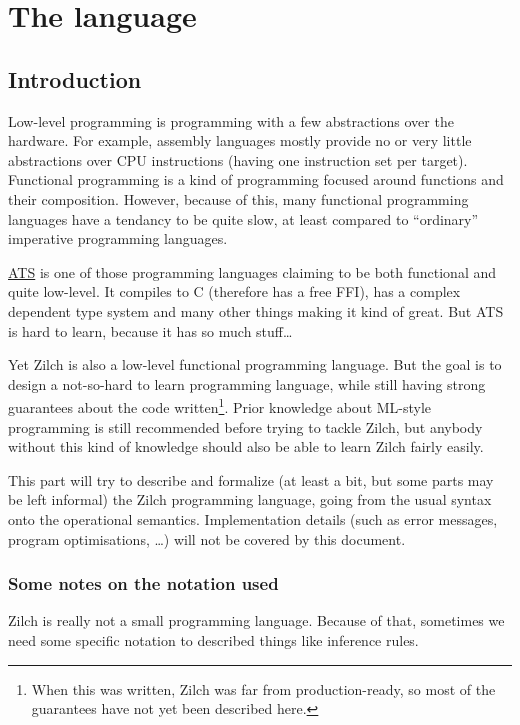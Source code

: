 \part{The language}\label{part:zilch}

\chapter{Introduction}\label{chap:zilch-introduction}

Low-level programming is programming with a few abstractions over the hardware.
For example, assembly languages mostly provide no or very little abstractions over CPU instructions (having one instruction set per target).
Functional programming is a kind of programming focused around functions and their composition.
However, because of this, many functional programming languages have a tendancy to be quite slow, at least compared to ``ordinary'' imperative programming languages.

\href{http://www.ats-lang.org/}{ATS} is one of those programming languages claiming to be both functional and quite low-level.
It compiles to C (therefore has a free FFI), has a complex dependent type system and many other things making it kind of great.
But ATS is hard to learn, because it has so much stuff\ldots

Yet Zilch is also a low-level functional programming language.
But the goal is to design a not-so-hard to learn programming language, while still having strong guarantees about the code written\footnote{When this was written, Zilch was far from production-ready, so most
	of the guarantees have not yet been described here.}.
Prior knowledge about ML-style programming is still recommended before trying to tackle Zilch, but anybody without this kind of knowledge should also be able to learn Zilch fairly easily.

This part will try to describe and formalize (at least a bit, but some parts may be left informal) the Zilch programming language, going from the usual syntax onto the operational semantics.
Implementation details (such as error messages, program optimisations, \ldots) will not be covered by this document.

\section*{Some notes on the notation used}\label{sec:zilch-introduction-notation}

Zilch is really not a small programming language.
Because of that, sometimes we need some specific notation to described things like inference rules.

